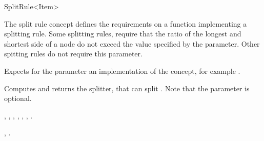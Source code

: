 

\begin{ccRefFunctionObjectConcept}{SplitRule<Item>}



\ccDefinition
  
The split rule concept defines the requirements on a function implementing a
splitting rule. Some splitting rules, require that the ratio of the longest and shortest side
of a node do not exceed the value specified by the  parameter.  Other
spitting rules do not require this parameter.

\ccParameters

Expects for the parameter  an implementation of the
 concept, for example .

\ccTypes


\ccCreation
{}  %



{Computes and returns the splitter, that can split . Note that the parameter 
is optional.}

\ccHasModels

,
,
,
,
,
,
.

\ccSeeAlso

,
.


\end{ccRefFunctionObjectConcept}


